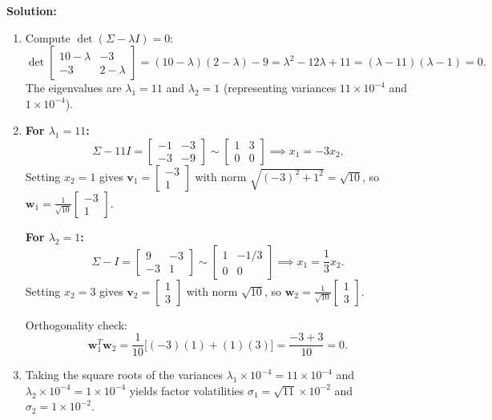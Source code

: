 \documentclass[11pt, letterpaper]{article}
\theoremstyle{definition}
\theoremstyle{remark}
\begin{document}
\textbf{Solution:}
\begin{enumerate}[label=(\alph*)]
    \item Compute $\det(\Sigma - \lambda I) = 0$:
    \[
    \det \begin{bmatrix} 10 - \lambda & -3 \\ -3 & 2 - \lambda \end{bmatrix} = (10 - \lambda)(2 - \lambda) - 9 = \lambda^2 - 12\lambda + 11 = (\lambda - 11)(\lambda - 1) = 0.
    \]
    The eigenvalues are $\lambda_1 = 11$ and $\lambda_2 = 1$ (representing variances $11 \times 10^{-4}$ and $1 \times 10^{-4}$).

    \item \textbf{For $\lambda_1 = 11$:}
    \[
    \Sigma - 11I = \begin{bmatrix} -1 & -3 \\ -3 & -9 \end{bmatrix} \sim \begin{bmatrix} 1 & 3 \\ 0 & 0 \end{bmatrix} \implies x_1 = -3x_2.
    \]
    Setting $x_2 = 1$ gives $\mathbf{v}_1 = \begin{bmatrix} -3 \\ 1 \end{bmatrix}$ with norm $\sqrt{(-3)^2 + 1^2} = \sqrt{10}$, so $\mathbf{w}_1 = \frac{1}{\sqrt{10}}\begin{bmatrix} -3 \\ 1 \end{bmatrix}$.

    \textbf{For $\lambda_2 = 1$:}
    \[
    \Sigma - I = \begin{bmatrix} 9 & -3 \\ -3 & 1 \end{bmatrix} \sim \begin{bmatrix} 1 & -1/3 \\ 0 & 0 \end{bmatrix} \implies x_1 = \frac{1}{3}x_2.
    \]
    Setting $x_2 = 3$ gives $\mathbf{v}_2 = \begin{bmatrix} 1 \\ 3 \end{bmatrix}$ with norm $\sqrt{10}$, so $\mathbf{w}_2 = \frac{1}{\sqrt{10}}\begin{bmatrix} 1 \\ 3 \end{bmatrix}$.

    Orthogonality check:
    \[
    \mathbf{w}_1^T \mathbf{w}_2 = \frac{1}{10}\bigl[(-3)(1) + (1)(3)\bigr] = \frac{-3 + 3}{10} = 0.
    \]

    \item Taking the square roots of the variances $\lambda_1 \times 10^{-4} = 11 \times 10^{-4}$ and $\lambda_2 \times 10^{-4} = 1 \times 10^{-4}$ yields factor volatilities $\sigma_1 = \sqrt{11} \times 10^{-2}$ and $\sigma_2 = 1 \times 10^{-2}$.
\end{enumerate}
\end{document}
